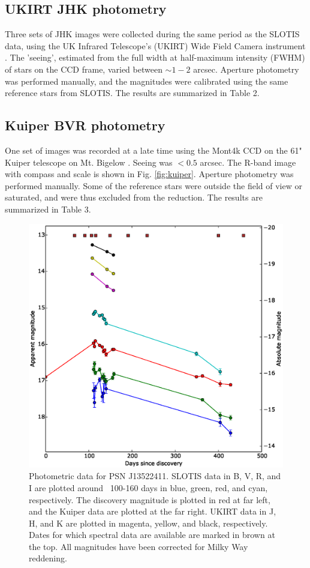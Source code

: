 \documentclass[iop]{emulateapj}
\begin{document}
\subsection{UKIRT JHK photometry} \label{obs:ukirt}
Three sets of JHK images were collected during the same period as the SLOTIS data, using the UK Infrared Telescope's (UKIRT) Wide Field Camera instrument \citep[WFCAM;][]{Hod09}. The 'seeing', estimated from the full width at half-maximum intensity (FWHM) of stars on the CCD frame, varied between $\sim1-2$ arcsec. Aperture photometry was performed manually, and the magnitudes were calibrated using the same reference stars from SLOTIS. The results are summarized in Table 2.

\subsection{Kuiper BVR photometry} \label{obs:kuiper}
One set of images was recorded at a late time using the Mont4k CCD on the 61" Kuiper telescope on Mt. Bigelow \citep{Fon14}. Seeing was $<0.5$ arcsec. The R-band image with compass and scale is shown in Fig. \ref{fig:kuiper}. Aperture photometry was performed manually. Some of the reference stars were outside the field of view or saturated, and were thus excluded from the reduction. The results are summarized in Table 3.

\begin{figure}
  \includegraphics[width=\linewidth]{graphics/multi_full_spectra.eps}
  \caption{Photometric data for PSN J13522411. SLOTIS data in B, V, R, and I are plotted around ~100-160 days in blue, green, red, and cyan, respectively. The discovery magnitude is plotted in red at far left, and the Kuiper data are plotted at the far right. UKIRT data in J, H, and K are plotted in magenta, yellow, and black, respectively. Dates for which spectral data are available are marked in brown at the top. All magnitudes have been corrected for Milky Way reddening.}
  \label{fig:curve}
\end{figure}
\end{document}
